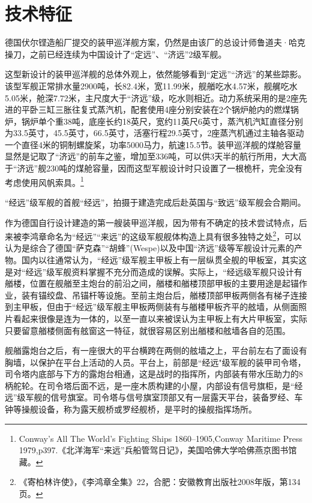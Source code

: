 \documentclass[12pt,UTF8]{ctexbook}
\begin{document}
\section{技术特征}

德国伏尔铿造船厂提交的装甲巡洋舰方案，仍然是由该厂的总设计师鲁道夫·哈克操刀，之前已经连续为中国设计了“定远”、“济远”2级军舰。

这型新设计的装甲巡洋舰的总体外观上，依然能够看到“定远”“济远”的某些踪影。该型军舰正常排水量2900吨，长82.4米，宽11.99米，舰艏吃水4.57米，舰艉吃水5.05米，舱深7.72米，主尺度大于“济远”级，吃水则相近。动力系统采用的是2座先进的平卧三缸三胀往复式蒸汽机，配套使用4座分别安装在2个锅炉舱内的燃煤锅炉，锅炉单个重38吨，底座长约18英尺，宽约11英尺6英寸，蒸汽机汽缸直径分别为33.5英寸，45.5英寸，66.5英寸，活塞行程29.5英寸，2座蒸汽机通过主轴各驱动一个直径4米的铜制螺旋桨，功率5000马力，航速15.5节。装甲巡洋舰的煤舱容量显然是记取了“济远”的前车之鉴，增加至336吨，可以供3天半的航行所用，大大高于“济远”舰230吨的煤舱容量，因而这型军舰设计时只设置了一根桅杆，完全没有考虑使用风帆索具。\footnote{Conway's All The World's Fighting Ships 1860--1905,Conway Maritime Press 1979,p397.《北洋海军“来远”兵船管驾日记》，美国哈佛大学哈佛燕京图书馆藏。}

“经远”级军舰的首舰“经远”，拍摄于建造完成后赴英国与“致远”级军舰会合期间。

作为德国自行设计建造的第一艘装甲巡洋舰，因为带有不确定的技术尝试特点，后来被李鸿章命名为“经远”“来远”的这级军舰舰体构造上具有很多独特之处\footnote{《寄柏林许使》，《李鸿章全集》22，合肥：安徽教育出版社2008年版，第134页。}，可以认为是综合了德国“萨克森”“胡蜂”(Wespe)以及中国“济远”级等军舰设计元素的产物。国内以往通常认为，“经远”级军舰主甲板上有一层纵贯全舰的甲板室，其实这是对“经远”级军舰资料掌握不充分而造成的误解。实际上，“经远级军舰只设计有艏楼，位置在舰艏至主炮台的前沿之间，艏楼和艏楼顶部甲板的主要用途是起锚作业，装有锚绞盘、吊锚杆等设施。至前主炮台后，艏楼顶部甲板两侧各有梯子连接到主甲板，但由于“经远”级军舰主甲板两侧装有与艏楼甲板齐平的舷墙，从侧面照片看起来很像是连为一体的，以至一直以来被误认为主甲板上有大片甲板室，实际只要留意艏楼侧面有舷窗这一特征，就很容易区别出艏楼和舷墙各自的范围。

舰艏露炮台之后，有一座很大的平台横跨在两侧的舷墙之上，平台前左右了面设有胸墙，以保护在平台上活动的人员。平台上，前部是“经远"级军舰的装甲司令塔，司令塔内底部与下方的露炮台相通，这是战时的指挥所，内部装有带水压助力的8柄舵轮。在司令塔后面不远，是一座木质构建的小屋，内部设有信号旗柜，是“经远”级军舰的信号旗室。司令塔与信号旗室顶部又有一层露天平台，装备罗经、车钟等操舰设备，称为露天舰桥或罗经舰桥，是平时的操舰指挥场所。
\end{document}
